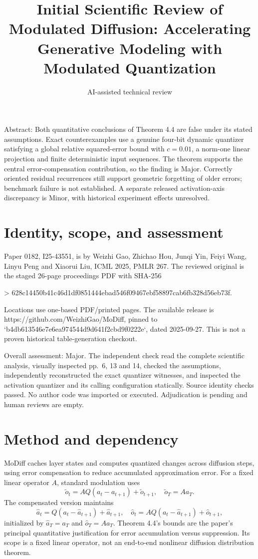 \documentclass[10pt]{article}
\title{Initial Scientific Review of
Modulated Diffusion: Accelerating Generative Modeling with Modulated Quantization}
\author{AI-assisted technical review}
\date{}
\begin{document}
\maketitle
Abstract: Both quantitative conclusions of Theorem 4.4 are false under its stated assumptions. Exact counterexamples use a genuine four-bit dynamic quantizer satisfying a global relative squared-error bound with \(c=0.01\), a norm-one linear projection and finite deterministic input sequences. The theorem supports the central error-compensation contribution, so the finding is Major. Correctly oriented residual recurrences still support geometric forgetting of older errors; benchmark failure is not established. A separate released activation-axis discrepancy is Minor, with historical experiment effects unresolved.\par
\section*{Identity, scope, and assessment}
Paper 0182, I25-43551, is by Weizhi Gao, Zhichao Hou, Junqi Yin, Feiyi Wang, Linyu Peng and Xiaorui Liu, ICML 2025, PMLR 267. The reviewed original is the staged 26-page proceedings PDF with SHA-256\par
> 628c14450b41c46d1df0851444ebad546f09467ebf58897cab6fb328d56eb73f.\par
Locations use one-based PDF/printed pages. The available release is https://github.com/WeizhiGao/MoDiff, pinned to `b4db613546e7e6ea974544d9d641f2cbd9f0222e`, dated 2025-09-27. This is not a proven historical table-generation checkout.\par
Overall assessment: Major. The independent check read the complete scientific analysis, visually inspected pp. 6, 13 and 14, checked the assumptions, independently reconstructed the exact quantizer witnesses, and inspected the activation quantizer and its calling configuration statically. Source identity checks passed. No author code was imported or executed. Adjudication is pending and human reviews are empty.\par
\section*{Method and dependency}
MoDiff caches layer states and computes quantized changes across diffusion steps, using error compensation to reduce accumulated approximation error. For a fixed linear operator \(A\), standard modulation uses \[\widetilde o_t=AQ(a_t-a_{t+1})+\widetilde o_{t+1},
 \quad \widetilde o_T=Aa_T.\] The compensated version maintains \[\widehat a_t=Q(a_t-\widehat a_{t+1})+\widehat a_{t+1},
 \quad
 \widehat o_t=AQ(a_t-\widehat a_{t+1})+\widehat o_{t+1},\] initialized by \(\widehat a_T=a_T\) and \(\widehat o_T=Aa_T\). Theorem 4.4’s bounds are the paper’s principal quantitative justification for error accumulation versus suppression. Its scope is a fixed linear operator, not an end-to-end nonlinear diffusion distribution theorem.\par
\end{document}
